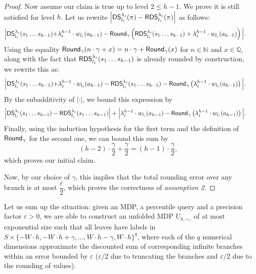\documentclass{llncs}
\newcommand{\states}{\ensuremath{S} }
\newcommand{\weight}{\ensuremath{w} }
\newcommand{\discSum}[1]{\ensuremath{{\sf DS}^{#1}} }
\newcommand{\discount}{\ensuremath{\lambda} }
\newcommand{\nat}{\ensuremath{\mathbb{N}} }
\newcommand{\rat}{\ensuremath{\mathbb{Q}} }
\newcommand{\round}{\ensuremath{{\sf Round}_{\gamma}} }
\newcommand{\roundedDiscSum}[1]{\ensuremath{{\sf RDS}^{#1}} }
\begin{document}
\begin{proof}
Now assume our claim is true up to level $2 \leq h-1$. We prove it is still satisfied for level $h$. Let us rewrite $\left\vert \discSum{\discount_{i}}_{l_{i}}(\pi) - \roundedDiscSum{\discount_{i}}_{l_{i}}(\pi) \right\vert$ as follows:
\begin{align*}
\Big\vert \discSum{\discount_{i}}_{l_{i}}(s_{1}\ldots{}s_{h-1}) + &\discount_{i}^{h-1} \cdot \weight_{l_{i}}(a_{h-1}) - \round\left( \roundedDiscSum{\discount_{i}}_{l_{i}}(s_{1}\ldots{}s_{h-1}) +  \discount_{i}^{h-1} \cdot \weight_{l_{i}}(a_{h-1}) \right)  \Big\vert.
\end{align*}
Using the equality $\round(n\cdot\gamma + x) = n\cdot\gamma + \round(x)$ for $n \in \nat$ and $x \in \rat$, along with the fact that $\roundedDiscSum{\discount_{i}}_{l_{i}}(s_{1}\ldots{}s_{h-1})$ is already rounded by construction, we rewrite this as:
\begin{align*}
\Big\vert \discSum{\discount_{i}}_{l_{i}}(s_{1}\ldots{}s_{h-1}) + &\discount_{i}^{h-1} \cdot \weight_{l_{i}}(a_{h-1}) - \roundedDiscSum{\discount_{i}}_{l_{i}}(s_{1}\ldots{}s_{h-1}) - \round\left(\discount_{i}^{h-1} \cdot \weight_{l_{i}}(a_{h-1}) \right)  \Big\vert.
\end{align*}
By the subadditivity of $\vert \cdot \vert$, we bound this expression by
\begin{align*}
\Big\vert \discSum{\discount_{i}}_{l_{i}}(s_{1}\ldots{}s_{h-1}) &- \roundedDiscSum{\discount_{i}}_{l_{i}}(s_{1}\ldots{}s_{h-1})\Big\vert + \Big\vert\discount_{i}^{h-1} \cdot \weight_{l_{i}}(a_{h-1}) - \round\left(\discount_{i}^{h-1} \cdot \weight_{l_{i}}(a_{h-1}) \right)  \Big\vert.
\end{align*}
Finally, using the induction hypothesis for the first term and the definition of $\round$ for the second one, we can bound this sum by
\begin{equation*}
(h-2)\cdot \dfrac{\gamma}{2} + \dfrac{\gamma}{2} = (h-1) \cdot \dfrac{\gamma}{2},
\end{equation*}
which proves our initial claim.

Now, by our choice of $\gamma$, this implies that the total rounding error over any branch is at most $\dfrac{\varepsilon}{2}$, which proves the correctness of \textit{assumption 2}.
\end{proof}

Let us sum up the situation: given an MDP, a percentile query and a precision factor $\varepsilon > 0$, we are able to construct an unfolded MDP $U_{h,\sim_{\gamma}}$ of at most exponential size such that all leaves have labels in $\states \times \{-W \cdot h, -W\cdot h + \gamma, \ldots{}, W\cdot h - \gamma, W \cdot h\}^{q}$, where each of the $q$ numerical dimensions approximate the discounted sum of corresponding infinite branches within an error bounded by $\varepsilon$ ($\varepsilon/2$ due to truncating the branches and $\varepsilon/2$ due to the rounding of values).
\end{document}
